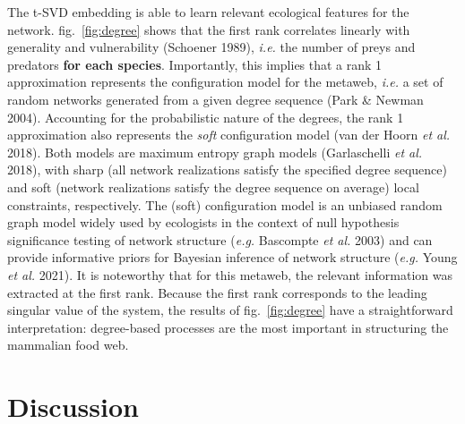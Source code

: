 \documentclass[11pt]{article}
\makeatletter
\def\maxwidth{\ifdim\Gin@nat@width>\linewidth\linewidth
\else\Gin@nat@width\fi}
\let\Oldincludegraphics\includegraphics
\renewcommand{\includegraphics}[1]{\Oldincludegraphics[width=\maxwidth]{#1}}
\providecommand{\DIFaddtex}[1]{{\bf #1}} %
\providecommand{\DIFaddbegin}{\protect\color{blue}} %
\providecommand{\DIFaddend}{\protect\color{black}} %
\providecommand{\DIFadd}[1]{\texorpdfstring{\DIFaddtex{#1}}{#1}} %
\newcommand{\DIFaddincludegraphics}[2][]{{\color{blue}\fbox{\DIFOincludegraphics[#1]{#2}}}} %
\DeclareRobustCommand{\DIFaddbegin}{\DIFOaddbegin \let\includegraphics\DIFaddincludegraphics} %
\DeclareRobustCommand{\DIFaddend}{\DIFOaddend \let\includegraphics\DIFOincludegraphics} %
\makeatother
\begin{document}
The t-SVD embedding is able to learn relevant ecological features for
the network. fig.~\ref{fig:degree} shows that the first rank correlates
linearly with generality and vulnerability (Schoener 1989), \emph{i.e.}
the number of preys and predators \DIFaddbegin \DIFadd{for each species}\DIFaddend . Importantly, this
implies that a rank 1 approximation represents the configuration model
for the metaweb, \emph{i.e.} a set of random networks generated from a
given degree sequence (Park \& Newman 2004). Accounting for the
probabilistic nature of the degrees, the rank 1 approximation also
represents the \emph{soft} configuration model (van der Hoorn \emph{et
al.} 2018). Both models are maximum entropy graph models (Garlaschelli
\emph{et al.} 2018), with sharp (all network realizations satisfy the
specified degree sequence) and soft (network realizations satisfy the
degree sequence on average) local constraints, respectively. The (soft)
configuration model is an unbiased random graph model widely used by
ecologists in the context of null hypothesis significance testing of
network structure (\emph{e.g.} Bascompte \emph{et al.} 2003) and can
provide informative priors for Bayesian inference of network structure
(\emph{e.g.} Young \emph{et al.} 2021). It is noteworthy that for this
metaweb, the relevant information was extracted at the first rank.
Because the first rank corresponds to the leading singular value of the
system, the results of fig.~\ref{fig:degree} have a straightforward
interpretation: degree-based processes are the most important in
structuring the mammalian food web.

\hypertarget{discussion}{%
\section{Discussion}\label{discussion}}
\end{document}
